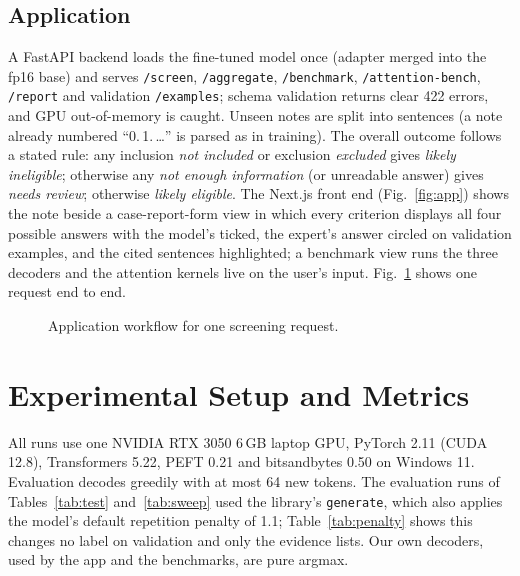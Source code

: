 \documentclass[conference]{IEEEtran}
\newcommand{\code}[1]{\texttt{\small #1}}
\begin{document}
\subsection{Application}\label{sec:app}
A FastAPI backend loads the fine-tuned model once (adapter merged into the fp16 base) and serves \code{/screen}, \code{/aggregate}, \code{/benchmark}, \code{/attention-bench}, \code{/report} and validation \code{/examples}; schema validation returns clear 422 errors, and GPU out-of-memory is caught. Unseen notes are split into sentences (a note already numbered ``0.\,1.\,\ldots'' is parsed as in training). The overall outcome follows a stated rule: any inclusion \emph{not included} or exclusion \emph{excluded} gives \emph{likely ineligible}; otherwise any \emph{not enough information} (or unreadable answer) gives \emph{needs review}; otherwise \emph{likely eligible}. The Next.js front end (Fig.~\ref{fig:app}) shows the note beside a case-report-form view in which every criterion displays all four possible answers with the model's ticked, the expert's answer circled on validation examples, and the cited sentences highlighted; a benchmark view runs the three decoders and the attention kernels live on the user's input. Fig.~\ref{fig:flow} shows one request end to end.

\begin{figure}[t]
\centering
{}
\caption{Application workflow for one screening request.}
\label{fig:flow}
\end{figure}

\section{Experimental Setup and Metrics}
All runs use one NVIDIA RTX 3050 6\,GB laptop GPU, PyTorch 2.11 (CUDA 12.8), Transformers 5.22, PEFT 0.21 and bitsandbytes 0.50 on Windows 11. Evaluation decodes greedily with at most 64 new tokens. The evaluation runs of Tables~\ref{tab:test} and~\ref{tab:sweep} used the library's \code{generate}, which also applies the model's default repetition penalty of 1.1; Table~\ref{tab:penalty} shows this changes no label on validation and only the evidence lists. Our own decoders, used by the app and the benchmarks, are pure argmax.
\end{document}

